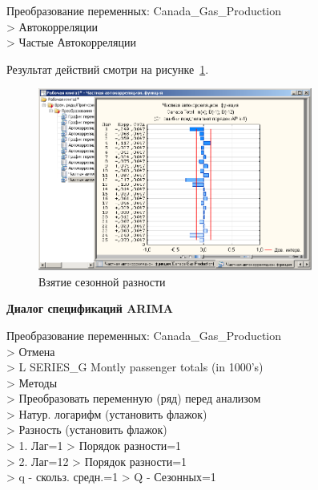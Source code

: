
\newpage

Преобразование переменных: Canada\_Gas\_Production\\
> Автокорреляции\\
> Частые Автокорреляции

Результат действий смотри на рисунке~\ref{fig:2_10}.

\begin{figure}[!h]
  \centering

  \includegraphics[height=6cm]
  {inc/Canada_Gas_Production/10.PNG}

  \caption{Взятие сезонной разности}

  \label{fig:2_10}
\end{figure}



\begin{center}
  \textbf{Диалог спецификаций ARIMA}
\end{center}

Преобразование переменных: Canada\_Gas\_Production\\
> Отмена\\
> L SERIES\_G Montly passenger totals (in 1000's)\\
> Методы\\
> Преобразовать переменную (ряд) перед анализом\\
> Натур. логарифм (установить флажок)\\
> Разность (установить флажок)\\
> 1. Лаг=1 > Порядок разности=1\\
> 2. Лаг=12 > Порядок разности=1\\
> q - скольз. средн.=1 > Q - Сезонных=1

